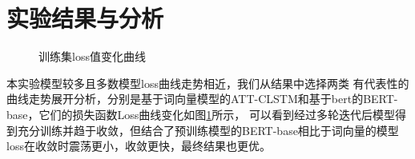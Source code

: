 \section{实验结果与分析}

\begin{figure}[htbp]
  \caption{训练集loss值变化曲线}
  \label{fig:loss}
  \end{figure}

本实验模型较多且多数模型loss曲线走势相近，我们从结果中选择两类
有代表性的曲线走势展开分析，分别是基于词向量模型的ATT-CLSTM和基于bert的BERT-base，它们的损失函数Loss曲线变化如图\ref{fig:loss}所示，
可以看到经过多轮迭代后模型得到充分训练并趋于收敛，但结合了预训练模型的BERT-base相比于词向量的模型loss在收敛时震荡更小，收敛更快，最终结果也更优。

